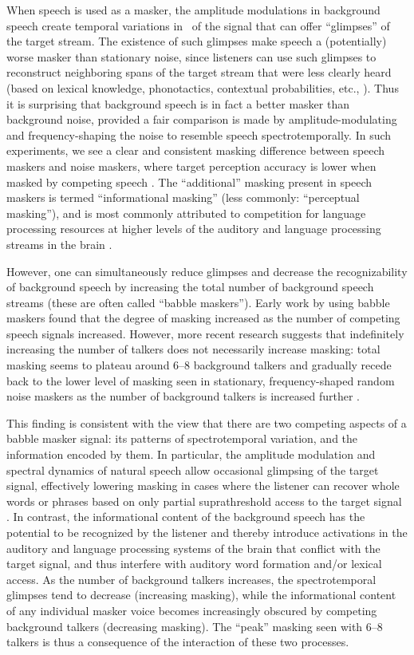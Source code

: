 When speech is used as a masker, the amplitude modulations in background speech create temporal variations in \snr\ of the signal that can offer “glimpses” of the target stream.  The existence of such glimpses make speech a (potentially) worse masker than stationary noise, since listeners can use such glimpses to reconstruct neighboring spans of the target stream that were less clearly heard (based on lexical knowledge, phonotactics, contextual probabilities, etc., \citealt{XXX}).  Thus it is surprising that background speech is in fact a better masker than background noise, provided a fair comparison is made by amplitude-modulating and frequency-shaping the noise to resemble speech spectrotemporally.  In such experiments, we see a clear and consistent masking difference between speech maskers and noise maskers, where target perception accuracy is lower when masked by competing speech \citep{CarhartEtAl1969,LewisEtAl1988,SimpsonCooke2005}.  The “additional” masking present in speech maskers is termed “informational masking” (less commonly: “perceptual masking”), and is most commonly attributed to competition for language processing resources at higher levels of the auditory and language processing streams in the brain \citep{DurlachEtAl2003,XXX}.

However, one can simultaneously reduce glimpses and decrease the recognizability of background speech by increasing the total number of background speech streams (these are often called “babble maskers”).  Early work by \citet{Miller1947} using babble maskers found that the degree of masking increased as the number of competing speech signals increased.  However, more recent research suggests that indefinitely increasing the number of talkers does not necessarily increase masking: total masking seems to plateau around 6–8 background talkers and gradually recede back to the lower level of masking seen in stationary, frequency-shaped random noise maskers as the number of background talkers is increased further \citep{BrungartEtAl2001,SimpsonCooke2005}.

This finding is consistent with the view that there are two competing aspects of a babble masker signal: its patterns of spectrotemporal variation, and the information encoded by them.  In particular, the amplitude modulation and spectral dynamics of natural speech allow occasional glimpsing of the target signal, effectively lowering masking in cases where the listener can recover whole words or phrases based on only partial suprathreshold access to the target signal \citep{Cooke2006}.  In contrast, the informational content of the background speech has the potential to be recognized by the listener and thereby introduce activations in the auditory and language processing systems of the brain that conflict with the target signal, and thus interfere with auditory word formation and/or lexical access.\citep{XXX}  As the number of background talkers increases, the spectrotemporal glimpses tend to decrease (increasing masking), while the informational content of any individual masker voice becomes increasingly obscured by competing background talkers (decreasing masking).  The “peak” masking seen with 6–8 talkers is thus a consequence of the interaction of these two processes. 

